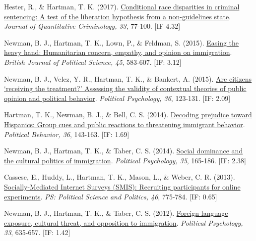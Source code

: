 \documentclass[12pt]{article}
\begin{document}
\begin{bibenum}
    \item Hester, R., \& {Hartman, T. K.} (2017). 
          \href{https://10.1007/s10940-016-9283-z}
          {Conditional race disparities in criminal sentencing: 
          A test of the liberation hypothesis from a non-guidelines state}. 
          \emph{Journal of Quantitative Criminology, 33}, 77-100. [IF 4.32]
          
    \item Newman, B. J., {Hartman, T. K.}, Lown, P., \& Feldman, S. (2015). 
          \href{https://10.1017/S0007123413000410}
          {Easing the heavy hand: Humanitarian concern, empathy, and 
          opinion on immigration}. 
          \emph{British Journal of Political Science, 45}, 583-607. [IF: 3.12]
           
    \item *Newman, B. J., Velez, Y. R., {Hartman, T. K.}, \& Bankert, A. (2015). 
          \href{https://10.1111/pops.12069}
          {Are citizens `receiving the treatment?' Assessing the validity 
          of contextual theories of public opinion and political behavior}. 
          \emph{Political Psychology, 36}, 123-131. [IF: 2.09]

    \item {Hartman, T. K.}, Newman, B. J., \& Bell, C. S. (2014). 
          \href{https://10.1007/s11109-013-9231-7}
          {Decoding prejudice toward Hispanics: 
			Group cues and public reactions to threatening immigrant behavior}.
          \emph{Political Behavior, 36}, 143-163. [IF: 1.69]
  
    \item *Newman, B. J., {Hartman, T. K.}, \& Taber, C. S. (2014). 
          \href{https://10.1111/pops.12047}
          {Social dominance and the cultural politics of immigration}. 
          \emph{Political Psychology, 35}, 165-186. [IF: 2.38]

    \item Cassese, E., Huddy, L., {Hartman, T. K.}, Mason, L., 
          \& Weber, C. R. (2013). 
          \href{https://10.1017/S1049096513001029}
          {Socially-Mediated Internet Surveys (SMIS): 
          Recruiting participants for online experiments}. 
          \emph{PS: Political Science and Politics, 46}, 775-784. [IF: 0.65]

    \item Newman, B. J., {Hartman, T. K.}, \& Taber, C. S. (2012). 
          \href{https://10.1111/j.1467-9221.2012.00904.x}
          {Foreign language exposure, cultural threat, and opposition to immigration}. 
          \emph{Political Psychology, 33}, 635-657. [IF: 1.42]


\end{bibenum}
\end{document}
